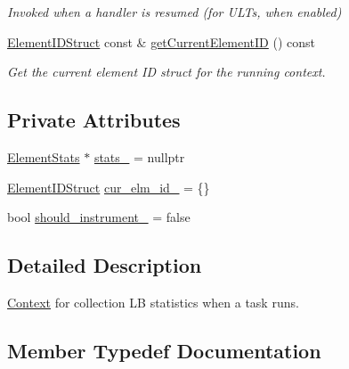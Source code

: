 \begin{DoxyCompactItemize}
\begin{DoxyCompactList}\small\item\em Invoked when a handler is resumed (for U\+L\+Ts, when enabled) \end{DoxyCompactList}\item 
\hyperlink{structvt_1_1ctx_1_1_l_b_stats_a9806d27212bffbbac72eb1e05f9e9880}{Element\+I\+D\+Struct} const  \& \hyperlink{structvt_1_1ctx_1_1_l_b_stats_acfcb5bb3b554fa1992525ec04d46b69e}{get\+Current\+Element\+ID} () const
\begin{DoxyCompactList}\small\item\em Get the current element ID struct for the running context. \end{DoxyCompactList}\end{DoxyCompactItemize}
\subsection*{Private Attributes}
\begin{DoxyCompactItemize}
\item 
\hyperlink{structvt_1_1ctx_1_1_l_b_stats_aaf24fff3db7252f70df0a02e12966eb4}{Element\+Stats} $\ast$ \hyperlink{structvt_1_1ctx_1_1_l_b_stats_a3cbfd8600aa3ba4284e3d2a6c4c7f07a}{stats\+\_\+} = nullptr
\item 
\hyperlink{structvt_1_1ctx_1_1_l_b_stats_a9806d27212bffbbac72eb1e05f9e9880}{Element\+I\+D\+Struct} \hyperlink{structvt_1_1ctx_1_1_l_b_stats_a54123d2d08b4dae9568a04697d400db7}{cur\+\_\+elm\+\_\+id\+\_\+} = \{\}
\item 
bool \hyperlink{structvt_1_1ctx_1_1_l_b_stats_ace63b8b294d303b5055a78a07ede6f5c}{should\+\_\+instrument\+\_\+} = false
\end{DoxyCompactItemize}


\subsection{Detailed Description}
\hyperlink{structvt_1_1ctx_1_1_context}{Context} for collection LB statistics when a task runs. 

\subsection{Member Typedef Documentation}
\mbox{\label{structvt_1_1ctx_1_1_l_b_stats_a9806d27212bffbbac72eb1e05f9e9880}} 
